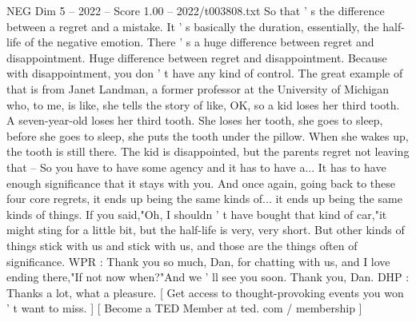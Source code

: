 \begin{textsample}{NEG Dim 5 – 2022 – Score 1.00 – 2022/t003808.txt}
So that ' s the difference between a regret and a mistake.
It ' s basically the duration, essentially, the half-life of the negative emotion.
There ' s a huge difference between regret and disappointment.
Huge difference between regret and disappointment.
Because with disappointment, you don ' t have any kind of control.
The great example of that is from Janet Landman, a former professor at the University of Michigan who, to me, is like, she tells the story of like, OK, so a kid loses her third tooth.
A seven-year-old loses her third tooth.
She loses her tooth, she goes to sleep, before she goes to sleep, she puts the tooth under the pillow.
When she wakes up, the tooth is still there.
The kid is disappointed, but the parents regret not leaving that -- So you have to have some agency and it has to have a...
It has to have enough significance that it stays with you.
And once again, going back to these four core regrets, it ends up being the same kinds of... it ends up being the same kinds of things.
If you said,"Oh, I shouldn ' t have bought that kind of car,"it might sting for a little bit, but the half-life is very, very short.
But other kinds of things stick with us and stick with us, and those are the things often of significance.
WPR : Thank you so much, Dan, for chatting with us, and I love ending there,"If not now when?"And we ' ll see you soon.
Thank you, Dan.
DHP : Thanks a lot, what a pleasure. [ Get access to thought-provoking events you won ' t want to miss. ] [ Become a TED Member at ted. com / membership ]

\end{textsample}
